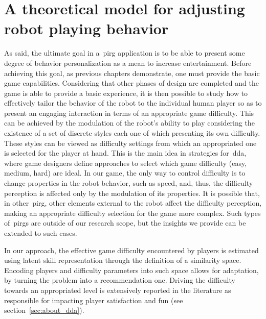 \chapter{A theoretical model for adjusting robot playing behavior}\label{ch:adaptation}

As said, the ultimate goal in a~\gls{pirg} application is to be able to present some degree of behavior personalization as a mean to increase entertainment. Before achieving this goal, as previous chapters demonstrate, one must provide the basic game capabilities. Considering that other phases of design are completed and the game is able to provide a basic experience, it is then possible to study how to effectively tailor the behavior of the robot to the individual human player so as to present an engaging interaction in terms of an appropriate game difficulty. This can be achieved by the modulation of the robot's ability to play considering the existence of a set of discrete styles each one of which presenting its own difficulty. These styles can be viewed as difficulty settings from which an appropriated one is selected for the player at hand. This is the main idea in strategies for~\glsdesc{dda}, where game designers define approaches to select which game difficulty (\eg easy, medium, hard) are ideal. 
In our game, the only way to control difficulty is to change properties in the robot behavior, such as speed, and, thus, the difficulty perception is affected only by the modulation of its properties. It is possible that, in other~\gls{pirg}, other elements external to the robot affect the difficulty perception, making an appropriate difficulty selection for the game more complex. Such types of~\gls{pirg}s are outside of our research scope, but the insights we provide can be extended to such cases. 

In our approach, the effective game difficulty encountered by players is estimated using latent skill representation through the definition of a similarity space. Encoding players and difficulty parameters into such space allows for adaptation, by turning the problem into a recommendation one. Driving the difficulty towards an appropriated level is extensively reported in the literature as responsible for impacting player satisfaction and fun (see section~\ref{sec:about_dda}).


